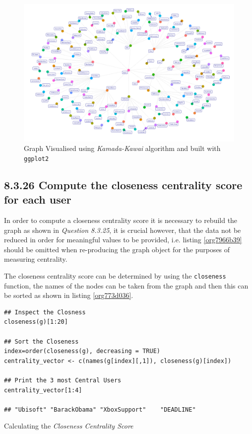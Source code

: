 \documentclass[11pt]{article}
\begin{document}
\begin{figure}[htbp]
\centering
\includegraphics[width=12cm]{./Figures/ggGraph.png}
\caption{\label{fig:orgf2fa832}Graph Visualised using \emph{Kamada-Kawai} algorithm and built with \texttt{ggplot2}}
\end{figure}
\subsection{8.3.26 Compute the \textbf{closeness} centrality score for each user}
\label{sec:org8909c8f}
In order to compute a closeness centrality score it is necessary to rebuild the
graph as shown in \emph{Question 8.3.25}, it is crucial however, that the data
not be reduced in order for meaningful values to be provided, i.e. listing
\ref{org7966b39} should be omitted when re-producing the graph object for the purposes of measuring centrality.

The closeness centrality score can be determined by using the \texttt{closeness} function, the names of the nodes can be taken from the graph and then this can be sorted as shown in listing \ref{org773d036}.

\begin{listing}[htbp]
\begin{verbatim}
## Inspect the Closness
closeness(g)[1:20]

## Sort the Closeness
index=order(closeness(g), decreasing = TRUE)
centrality_vector <- c(names(g[index][,1]), closeness(g)[index])

## Print the 3 most Central Users
centrality_vector[1:4]

## "Ubisoft" "BarackObama" "XboxSupport"    "DEADLINE"
\end{verbatim}
\caption{\label{org773d036}Calculating the \emph{Closeness Centrality Score}}
\end{listing}
\end{document}
